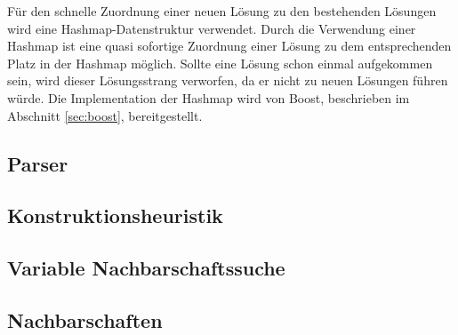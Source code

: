 Für den schnelle Zuordnung einer neuen Lösung zu den bestehenden Lösungen wird eine Hashmap-Datenstruktur verwendet. Durch die Verwendung einer
Hashmap ist eine quasi sofortige Zuordnung einer Lösung zu dem entsprechenden Platz in der Hashmap möglich. Sollte eine Lösung schon einmal 
aufgekommen sein, wird dieser Lösungsstrang verworfen, da er nicht zu neuen Lösungen führen würde. Die Implementation der Hashmap wird von 
Boost, beschrieben im Abschnitt \ref{sec:boost}, bereitgestellt.

\subsection{Parser}
\label{sec:parser}


\subsection{Konstruktionsheuristik}

\subsection{Variable Nachbarschaftssuche}

\subsection{Nachbarschaften}



 
